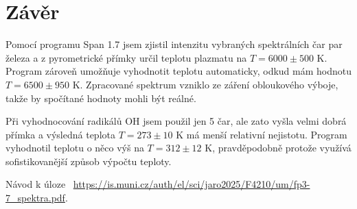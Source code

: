 \documentclass[a4paper,11pt]{article}
\begin{document}
\newpage

\section{Závěr}

Pomocí programu Span 1.7 jsem zjistil intenzitu vybraných spektrálních čar par železa a z pyrometrické přímky určil teplotu plazmatu na $ T = 6000 \pm 500 $ K. Program zároveň umožňuje vyhodnotit teplotu automaticky, odkud mám hodnotu $ T = 6500 \pm 950 $ K. Zpracované spektrum vzniklo ze záření obloukového výboje, takže by spočítané hodnoty mohli být reálné. 

Při vyhodnocování radikálů OH jsem použil jen 5 čar, ale zato vyšla velmi dobrá přímka a výsledná teplota $ T = 273 \pm 10 $ K má menší relativní nejistotu. Program vyhodnotil teplotu o něco výš na $ T = 312 \pm 12 $ K, pravděpodobně protože využívá sofistikovanější způsob výpočtu teploty. 

\begin{thebibliography}{0}
 Návod k úloze ~\url{https://is.muni.cz/auth/el/sci/jaro2025/F4210/um/fp3-7_spektra.pdf}.   
\end{thebibliography}
\end{document}
